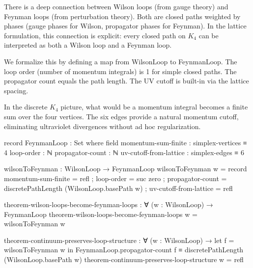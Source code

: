 \documentclass[11pt,a4paper]{book}
\def\texttt#1{#1}%
\begin{document}
There is a deep connection between Wilson loops (from gauge theory) and Feynman loops (from 
perturbation theory). Both are closed paths weighted by phases (gauge phases for Wilson, 
propagator phases for Feynman). In the lattice formulation, this connection is explicit: 
every closed path on $K_4$ can be interpreted as both a Wilson loop and a Feynman loop.

We formalize this by defining a map from \texttt{WilsonLoop} to \texttt{FeynmanLoop}. The 
loop order (number of momentum integrals) is 1 for simple closed paths. The propagator count 
equals the path length. The UV cutoff is built-in via the lattice spacing.

In the discrete $K_4$ picture, what would be a momentum integral becomes a finite sum over the four vertices. The six edges provide a natural momentum cutoff, eliminating ultraviolet divergences without ad hoc regularization.

\begin{code}
record FeynmanLoop : Set where
  field
    momentum-sum-finite    : simplex-vertices ≡ 4
    loop-order             : ℕ
    propagator-count       : ℕ
    uv-cutoff-from-lattice : simplex-edges ≡ 6

wilsonToFeynman : WilsonLoop → FeynmanLoop
wilsonToFeynman w = record
  { momentum-sum-finite    = refl
  ; loop-order             = suc zero
  ; propagator-count       = discretePathLength (WilsonLoop.basePath w)
  ; uv-cutoff-from-lattice = refl
  }

theorem-wilson-loops-become-feynman-loops : ∀ (w : WilsonLoop) →
  FeynmanLoop
theorem-wilson-loops-become-feynman-loops w = wilsonToFeynman w

theorem-continuum-preserves-loop-structure : 
  ∀ (w : WilsonLoop) → 
  let f = wilsonToFeynman w in
  FeynmanLoop.propagator-count f ≡ discretePathLength (WilsonLoop.basePath w)
theorem-continuum-preserves-loop-structure w = refl
\end{code}
\end{document}

